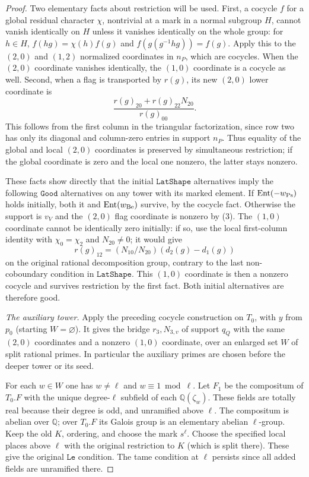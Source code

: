 \begin{proof}
Two elementary facts about restriction will be used.
First, a cocycle \(f\) for a global residual character
\(\chi\), nontrivial at a mark in a normal subgroup \(H\),
cannot vanish identically on \(H\) unless it vanishes
identically on the whole group: for \(h\in H\),
\(f(hg)=\chi(h)f(g)\) and
\(f(g(g^{-1}hg))=f(g)\).
Apply this to the \((2,0)\) and \((1,2)\) normalized
coordinates in \(n_P\), which are cocycles. When the
\((2,0)\) coordinate vanishes identically, the \((1,0)\)
coordinate is a cocycle as well.
Second, when a flag is transported by \(r(g)\), its
new \((2,0)\) lower coordinate is
\[
 \frac{r(g)_{20}+r(g)_{22}N_{20}}{r(g)_{00}}.
 \tag{3}
\]
This follows from the first column in the triangular
factorization, since row two has only its diagonal and
column-zero entries in support \(n_P\). Thus equality
of the global and local \((2,0)\) coordinates is
preserved by simultaneous restriction; if the global
coordinate is zero and the local one nonzero, the latter
stays nonzero.

These facts show directly that the initial
\(\texttt{LatShape}\) alternatives imply the following
\(\texttt{Good}\) alternatives on any tower with its
marked element. If \(\operatorname{Ent}(-w_{\rm Ps})\)
holds initially, both it and \(\operatorname{Ent}(w_{\rm Be})\)
survive, by the cocycle fact. Otherwise the support is
\(v_V\) and the \((2,0)\) flag coordinate is nonzero
by (3). The \((1,0)\) coordinate cannot be identically
zero initially: if so, use the local first-column identity
with \(\chi_0=\chi_2\) and \(N_{20}\ne0\); it would give
\[
 r(g)_{12}=(N_{10}/N_{20})(d_2(g)-d_1(g))
\]
on the original rational decomposition group, contrary
to the last non-coboundary condition in \(\texttt{LatShape}\).
This \((1,0)\) coordinate is then a nonzero cocycle and
survives restriction by the first fact.
Both initial alternatives are therefore good.

\emph{The auxiliary tower.}
Apply the preceding cocycle construction on \(T_0\), with
\(y\) from \(p_0\) (starting \(W=\varnothing\)).
It gives the bridge \(r_3,N_{3,v}\) of support \(q_Q\)
with the same \((2,0)\) coordinates and a nonzero
\((1,0)\) coordinate, over an enlarged set \(W\)
of split rational primes. In particular the auxiliary
primes are chosen before the deeper tower or its seed.

For each \(w\in W\) one has \(w\ne\ell\) and
\(w\equiv1\bmod\ell\). Let \(F_1\) be the compositum
of \(T_0.F\) with the unique degree-\(\ell\) subfield
of each \(\mathbb Q(\zeta_w)\). These fields are totally
real because their degree is odd, and unramified above
\(\ell\). The compositum is abelian over \(\mathbb Q\);
over \(T_0.F\) its Galois group is an elementary abelian
\(\ell\)-group. Keep the old \(K\), ordering, and choose
the mark \(s^\ell\). Choose the specified local places
above \(\ell\) with the original restriction to \(K\)
(which is split there). These give the original
\(\texttt{Le}\) condition. The tame condition at \(\ell\)
persists since all added fields are unramified there.


\end{proof}
